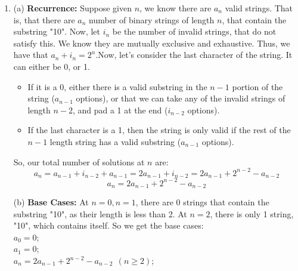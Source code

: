 \documentclass[a4paper]{article}
\begin{document}
\begin{enumerate}
    (c) We get a generating function for the recurrence relation as follows:
    \begin{align*}
A(x) &= \sum_{n\geq 0} a_n x^n = \sum_{n \geq 5} (a_{n-1}+a_{n-2}+a_{n-5})x^n + a_0 + a_1 x + a_2 x^2 + a_3 x^3 + a_4 x^4\\
&= x(\sum_{n \geq 4} a_n x^n) + x^2(\sum_{n \geq 3} a_n x^n) + x^5(\sum_{n \geq 0} a_n x^n) + 1 + x + 2x^2 + 3x^3 + 5x^4\\
&= x(A(x) - 1 - x - 2x^2 - 3x^3) + x^2(A(x) - 1 - x - 2x^2) + x^5A(x) + 1 + x + 2x^2 + 3x^3 + 5x^4
    \end{align*}
$A(x)(1-x-x^2-x^5) = 1 + x + 2x^2 + 3x^3 + 5x^4 -x - x^2 -2x^3 - 3x^4 - x^2 -x^3 - 2x^4 = 1$
$$A(x) = \frac{1}{1-x-x^2-x^5}$$

\newpage

\item (a) \textbf{Recurrence:} Suppose given $n$, we know there are $a_n$ valid strings. That is, that there are $a_n$ number of binary strings of length $n$, that contain the substring "10". Now, let $i_n$ be the number of invalid strings, that do not satisfy this. We know they are mutually exclusive and exhaustive. Thus, we have that $a_n + i_n = 2^n$.Now, let's consider the last character of the string. It can either be 0, or 1.
\begin{itemize}
    \item If it is a 0, either there is a valid substring in the $n-1$ portion of the string ($a_{n-1}$ options), or that we can take any of the invalid strings of length $n-2$, and pad a 1 at the end ($i_{n-2}$ options).
    \item If the last character is a 1, then the string is only valid if the rest of the $n-1$ length string has a valid substring ($a_{n-1}$ options).
\end{itemize}

So, our total number of solutions at $n$ are:
$$
    a_n = a_{n-1} + i_{n-2} + a_{n-1} = 2a_{n-1} + i_{n-2} = 2a_{n-1} + 2^{n-2} - a_{n-2}$$
$$
    a_n = 2a_{n-1} + 2^{n-2} - a_{n-2}
$$

(b) \textbf{Base Cases:} At $n=0, n=1$, there are 0 strings that contain the substring "10", as their length is less than 2. At $n=2$, there is only 1 string, "10", which contains itself. So we get the base cases:\\
$a_0 = 0$;\\
$a_1 = 0$;\\
$a_n = 2a_{n-1} + 2^{n-2} - a_{n-2}\ \ (n \geq 2)$;\\


\end{enumerate}
\end{document}
